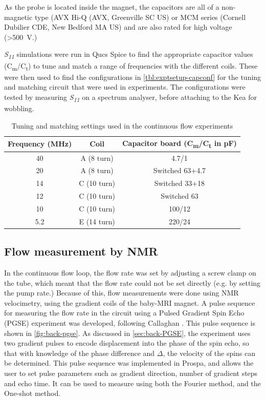 As the probe is located inside the magnet, the capacitors are all of a non-magnetic type (AVX Hi-Q (AVX, Greenville SC US)  or MCM series (Cornell Dubilier CDE, New Bedford MA US) and are also rated for high voltage (\SI{>500}{V}.)

\textit{S\textsubscript{11}} simulations were run in Qucs Spice to find the appropriate capacitor values (C\textsubscript{m}/C\textsubscript{t}) to tune and match a range of frequencies with the different coils.
These were then used to find the configurations in \autoref{tbl:exptsetup-capconf} for the tuning and matching circuit that were used in experiments.
The configurations were tested by measuring \textit{S\textsubscript{11}} on a spectrum analyser, before attaching to the Kea for wobbling.

\begin{table}[ht]
\centering
\begin{tabular}{|c|c|c|}
\hline
Frequency (\si{MHz}) & Coil & Capacitor board (C\textsubscript{m}/C\textsubscript{t} in \si{pF})\\
\hline
40 & A (8 turn) & 4.7/1 \\
20 & A (8 turn) & Switched 63+4.7 \\
14 & C (10 turn) & Switched 33+18 \\
12 & C (10 turn) & Switched 63 \\
10 & C (10 turn) & 100/12 \\
5.2 & E (14 turn) & 220/24 \\
\hline
\end{tabular}
\caption{Tuning and matching settings used in the continuous flow experiments}
\label{tbl:exptsetup-capconf}
\end{table}

\subsection{Flow measurement by NMR}
In the continuous flow loop, the flow rate was set by adjusting a screw clamp on the tube, which meant that the flow rate could not be set directly (e.g. by setting the pump rate.)
Because of this, flow measurements were done using NMR velocimetry, using the gradient coils of the baby-MRI magnet.
A pulse sequence for measuring the flow rate in the circuit using a Pulsed Gradient Spin Echo (PGSE) experiment was developed, following Callaghan \cite{CallaghanTranslationalDynamicsMagnetic2014}.
This pulse sequence is shown in \autoref{fig:back-pgse}.
As discussed in \autoref{sec:back-PGSE}, the experiment uses two gradient pulses to encode displacement into the phase of the spin echo, so that with knowledge of the phase difference and $\Delta$, the velocity of the spins can be determined.
This pulse sequence was implemented in Prospa, and allows the user to set pulse parameters such as gradient direction, number of gradient steps and echo time.
It can be used to measure using both the Fourier method, and the One-shot method.

